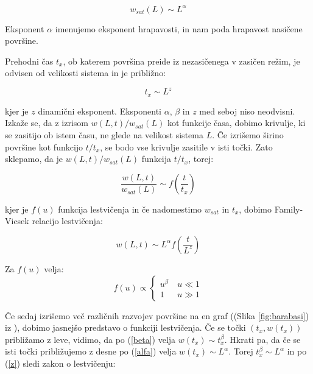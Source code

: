 \documentclass[a4paper, oneside, 12pt]{book}
\begin{document}
        \begin{equation}
          w_{sat}(L) \sim L^\alpha
          \label{alfa}
        \end{equation}

        Eksponent $\alpha$ imenujemo eksponent hrapavosti, in nam poda hrapavost nasičene površine.

        Prehodni čas $t_x$, ob katerem površina preide iz nezasičenega v zasičen režim, je odvisen od velikosti sistema in je približno:

        \begin{equation}
          t_x \sim L^z
          \label{z}
        \end{equation}

        kjer je $z$ dinamični eksponent.
        Eksponenti $\alpha$, $\beta$ in $z$ med seboj niso neodvisni.
        Izkaže se, da z izrisom $w(L,t)/w_{sat}(L)$ kot funkcije časa, dobimo krivulje, ki se zasitijo ob istem času, ne glede na velikost sistema $L$.
        Če izrišemo širino površine kot funkcijo $t/t_x$, se bodo vse krivulje zasitile v isti točki.
        Zato sklepamo, da je $w(L,t)/w_{sat}(L)$ funkcija $t/t_x$, torej:

        \begin{equation}
          \frac{w(L,t)}{w_{sat}(L)} \sim f(\frac{t}{t_x})
        \end{equation}

        kjer je $f(u)$ funkcija lestvičenja in če nadomestimo $w_{sat}$ in $t_x$, dobimo Family-Vicsek relacijo lestvičenja:

        \begin{equation}
          w(L,t) \sim L^\alpha f(\frac{t}{L^z})
          \label{family-vicsek}
        \end{equation}

        Za $f(u)$ velja:
        \begin{equation}
          f(u) \propto \left \{ \begin{array}{lr} u^{\beta} & \ u\ll 1 \\
            1 & \ u\gg1\end{array} \right. 
        \end{equation}

            Če sedaj izrišemo več različnih razvojev površine na en graf ((Slika \ref{fig:barabasi}) iz \cite{barabasi1995fractal}), dobimo jasnejšo predstavo o funkciji lestvičenja. Če se točki $(t_x,w(t_x))$ približamo z leve, vidimo, da po (\ref{beta}) velja $w(t_x) \sim t_x^\beta$. Hkrati pa, da če se isti točki približujemo z desne po (\ref{alfa}) velja $w(t_x) \sim L^\alpha$. Torej $t_x^\beta \sim L^\alpha$ in po (\ref{z}) sledi zakon o lestvičenju:
\end{document}
